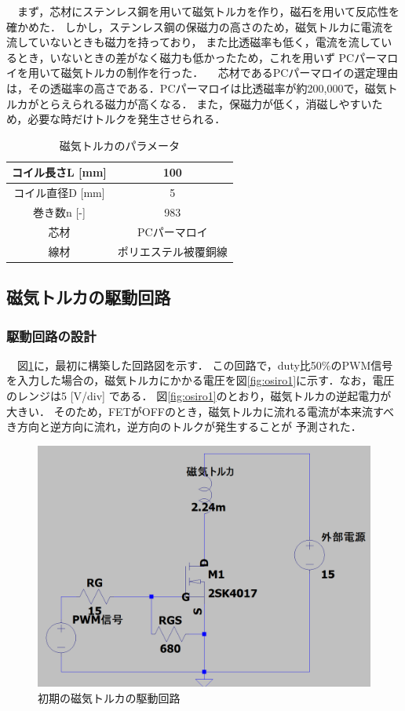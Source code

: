 　まず，芯材にステンレス鋼を用いて磁気トルカを作り，磁石を用いて反応性を確かめた．
しかし，ステンレス鋼の保磁力の高さのため，磁気トルカに電流を流していないときも磁力を持っており，
また比透磁率も低く，電流を流しているとき，いないときの差がなく磁力も低かったため，これを用いず
PCパーマロイを用いて磁気トルカの制作を行った．
　芯材であるPCパーマロイの選定理由は，その透磁率の高さである．PCパーマロイは比透磁率が約200,000で，磁気トルカがとらえられる磁力が高くなる．
また，保磁力が低く，消磁しやすいため，必要な時だけトルクを発生させられる．


\begin{table}[H]
	\centering
	\caption{磁気トルカのパラメータ}
	\label{table:torquer}
	\begin{tabular}{|c||c|}
		\hline
		コイル長さL [mm] & 100\\ \hline
		コイル直径D [mm] & 5\\ \hline
		巻き数n [-] & 983 \\ \hline
		芯材 & PCパーマロイ \\ \hline
		線材 & ポリエステル被覆銅線 \\ \hline    
	\end{tabular}
\end{table}


\subsection{磁気トルカの駆動回路}
\subsubsection{駆動回路の設計}
　図\ref{fig:cirkit1}に，最初に構築した回路図を示す．
この回路で，duty比50\%のPWM信号を入力した場合の，磁気トルカにかかる電圧を図\ref{fig:osiro1}に示す．なお，電圧のレンジは5 [V/div] である．
図\ref{fig:osiro1}のとおり，磁気トルカの逆起電力が大きい．
そのため，FETがOFFのとき，磁気トルカに流れる電流が本来流すべき方向と逆方向に流れ，逆方向のトルクが発生することが
予測された．

\begin{figure}[H]
	\centering
		\includegraphics[scale=0.3]{./figure/回路図1.png}
		\caption{初期の磁気トルカの駆動回路}
		\label{fig:cirkit1}
\end{figure}


